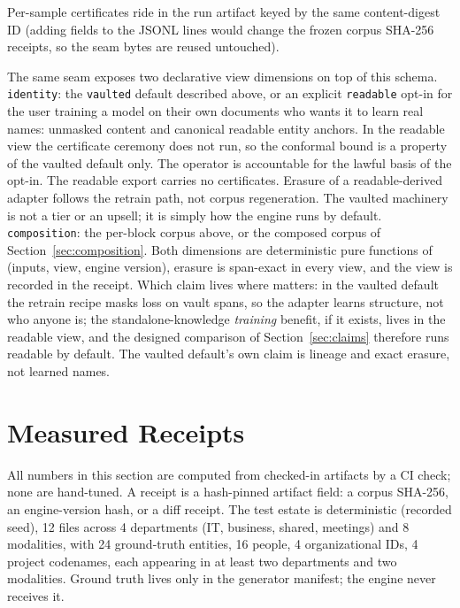 \documentclass{article}
\begin{document}
Per-sample certificates ride in the run artifact keyed by the same content-digest ID (adding fields to the JSONL lines would change the frozen corpus SHA-256 receipts, so the seam bytes are reused untouched).

The same seam exposes two declarative view dimensions on top of this schema. \texttt{identity}: the \texttt{vaulted} default described above, or an explicit \texttt{readable} opt-in for the user training a model on their own documents who wants it to learn real names: unmasked content and canonical readable entity anchors. In the readable view the certificate ceremony does not run, so the conformal bound is a property of the vaulted default only. The operator is accountable for the lawful basis of the opt-in. The readable export carries no certificates. Erasure of a readable-derived adapter follows the retrain path, not corpus regeneration. The vaulted machinery is not a tier or an upsell; it is simply how the engine runs by default. \texttt{composition}: the per-block corpus above, or the composed corpus of Section~\ref{sec:composition}. Both dimensions are deterministic pure functions of (inputs, view, engine version), erasure is span-exact in every view, and the view is recorded in the receipt. Which claim lives where matters: in the vaulted default the retrain recipe masks loss on vault spans, so the adapter learns structure, not who anyone is; the standalone-knowledge \emph{training} benefit, if it exists, lives in the readable view, and the designed comparison of Section~\ref{sec:claims} therefore runs readable by default. The vaulted default's own claim is lineage and exact erasure, not learned names.

\section{Measured Receipts}
\label{sec:measurements}

All numbers in this section are computed from checked-in artifacts by a CI check; none are hand-tuned. A receipt is a hash-pinned artifact field: a corpus SHA-256, an engine-version hash, or a diff receipt. The test estate is deterministic (recorded seed), 12 files across 4 departments (IT, business, shared, meetings) and 8 modalities, with 24 ground-truth entities, 16 people, 4 organizational IDs, 4 project codenames, each appearing in at least two departments and two modalities. Ground truth lives only in the generator manifest; the engine never receives it.
\end{document}
